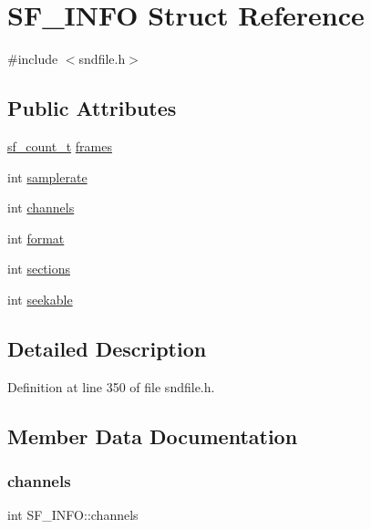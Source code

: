 \hypertarget{struct_s_f___i_n_f_o}{}\section{S\+F\+\_\+\+I\+N\+FO Struct Reference}
\label{struct_s_f___i_n_f_o}


{\ttfamily \#include $<$sndfile.\+h$>$}

\subsection*{Public Attributes}
\begin{DoxyCompactItemize}
\item 
\mbox{\hyperlink{sndfile_8h_af2b12fded74bc949f1f1f392a2af4892}{sf\+\_\+count\+\_\+t}} \mbox{\hyperlink{struct_s_f___i_n_f_o_a80838e7063ecc3d8d7ff9f92ab1efdfb}{frames}}
\item 
int \mbox{\hyperlink{struct_s_f___i_n_f_o_acfd248e20ab1c58b57aafc7b16404a5f}{samplerate}}
\item 
int \mbox{\hyperlink{struct_s_f___i_n_f_o_aad5220b31d2672bf83d3cf4cea0b2826}{channels}}
\item 
int \mbox{\hyperlink{struct_s_f___i_n_f_o_a36a7c3ae9a8229797f19267b4ba07361}{format}}
\item 
int \mbox{\hyperlink{struct_s_f___i_n_f_o_a5f4c7cb564c05f6c3eeac9164a806544}{sections}}
\item 
int \mbox{\hyperlink{struct_s_f___i_n_f_o_ad8978123d4122e137e9500f65d28ac31}{seekable}}
\end{DoxyCompactItemize}


\subsection{Detailed Description}


Definition at line 350 of file sndfile.\+h.



\subsection{Member Data Documentation}
\mbox{\label{struct_s_f___i_n_f_o_aad5220b31d2672bf83d3cf4cea0b2826}} 
\subsubsection{\texorpdfstring{channels}{channels}}
{\footnotesize\ttfamily int S\+F\+\_\+\+I\+N\+F\+O\+::channels}



